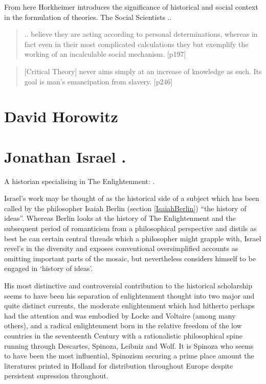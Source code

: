 \documentclass[10pt,titlepage]{book}
\begin{document}
From here Horkheimer introduces the significance of historical and social context in the formulation of theories.
The Social Scientists ..
\begin{quote}
.. believe they are acting according to personal
determinations, whereas in fact even in their most complicated
calculations they but exemplify the working of an incalculable
social mechanism. [p197]
\end{quote}

\begin{quote}
  [Critical Theory] never aims simply at an increase of knowledge as such. Its goal is man's emancipation from slavery. [p246]
\end{quote}

\section{David Horowitz}

\cite{horowitz-paau,horowitz-bbal}

\section{Jonathan Israel \cite{israel2011revolution,israel2013democratic,israel2006enlightenment,israel2002radical}.}

A historian specialising in The Enlightenment:
\cite{israel2011revolution,israel2013democratic,israel2006enlightenment,israel2002radical}.

Israel's work may be thought of as the historical side of a subject which has been called by the philosopher Isaiah Berlin (section \ref{IsaiahBerlin}) ``the history of ideas''.
Whereas Berlin looks at the history of The Enlightenment and the subsequent period of romanticism from a philosophical perspective and distils as best he can certain central threads which a philosopher might grapple with, Israel revel's in the diversity and exposes conventional oversimplified accounts as omitting important parts of the mosaic, but nevertheless considers himself to be engaged in `history of ideas'.

His most distinctive and controversial contribution to the historical scholarship seems to have been his separation of enlightenment thought into two major and quite distinct currents, the moderate enlightenment which had hitherto perhaps had the attention and was embodied by Locke and Voltaire (among many others), and a radical enlightenment born in the relative freedom of the low countries in the seventeenth Century with a rationalistic philosophical spine running through Descartes, Spinoza, Leibniz and Wolf.
It is Spinoza who seems to have been the most influential, Spinozism securing a prime place amount the literatures printed in Holland for distribution throughout Europe despite persistent supression throughout.
\end{document}
